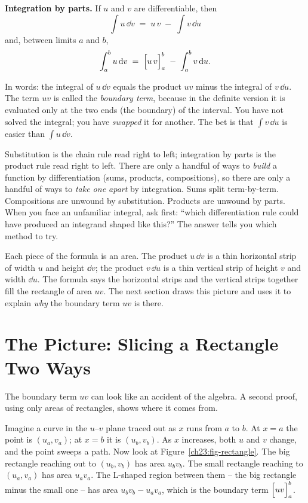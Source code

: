 \begin{focusbox}
\textbf{Integration by parts.} If $u$ and $v$ are differentiable, then
\[
\boxed{\;\int u\,\dd v \;=\; u\,v \;-\; \int v\,\dd u\;}
\]
and, between limits $a$ and $b$,
\[
\int_{a}^{b} u\,\mathrm{d} v \;=\; \Big[u\,v\Big]_{a}^{b} \;-\; \int_{a}^{b} v\,\mathrm{d} u.
\]
\end{focusbox}

In words: the integral of $u\,\dd v$ equals the product $uv$ minus the integral
of $v\,\dd u$. The term $uv$ is called the \emph{boundary term}, because in the
definite version it is evaluated only at the two ends (the boundary) of the
interval. You have not solved the integral; you have \emph{swapped} it for
another. The bet is that $\int v\,\dd u$ is easier than $\int u\,\dd v$.

\begin{whybox}
Substitution is the chain rule read right to left; integration by parts is the
product rule read right to left. There are only a handful of ways to
\emph{build} a function by differentiation (sums, products, compositions), so
there are only a handful of ways to \emph{take one apart} by integration. Sums
split term-by-term. Compositions are unwound by substitution. Products are unwound
by parts. When you face an unfamiliar integral, ask first:
``which differentiation rule could have produced an integrand shaped like this?''
The answer tells you which method to try.
\end{whybox}

\begin{happeningbox}
Each piece of the formula is an area. The product $u\,\dd v$ is a thin
horizontal strip of width $u$ and height $\dd v$; the product $v\,\dd u$ is a thin
vertical strip of height $v$ and width $\dd u$. The formula says the horizontal
strips and the vertical strips together fill the rectangle of area $uv$. The next
section draws this picture and uses it to explain \emph{why} the boundary term
$uv$ is there.
\end{happeningbox}

\section{The Picture: Slicing a Rectangle Two Ways}
\label{ch23:picture}

The boundary term $uv$ can look like an accident of the algebra. A second proof,
using only areas of rectangles, shows where it comes from.

Imagine a curve in the $u$--$v$ plane traced out as $x$ runs from $a$ to $b$. At
$x=a$ the point is $(u_a, v_a)$; at $x=b$ it is $(u_b, v_b)$. As $x$ increases,
both $u$ and $v$ change, and the point sweeps a path. Now look at
Figure~\ref{ch23:fig-rectangle}. The big rectangle reaching out to $(u_b,v_b)$
has area $u_b v_b$. The small rectangle reaching to $(u_a,v_a)$ has area
$u_a v_a$. The L-shaped region between them -- the big rectangle minus the small
one -- has area $u_b v_b - u_a v_a$, which is the boundary term
$\Big[uv\Big]_{a}^{b}$.

